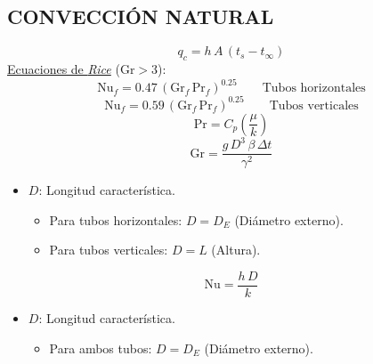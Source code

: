 \documentclass[letter,oneside,10pt]{article}
\begin{document}
\begin{multicols}{3}
\section*{CONVECCIÓN NATURAL}
\begin{equation*}
    q_c = h\,A\,(t_s-t_\infty)
\end{equation*}
\underline{Ecuaciones de \emph{Rice}} ($\text{Gr} > 3$):
\begin{equation*}
    \text{Nu}_f = 0.47\,(\text{Gr}_f\,\text{Pr}_f)^{0.25}
    \qquad\text{Tubos horizontales}
\end{equation*}
\begin{equation*}
    \text{Nu}_f = 0.59\,(\text{Gr}_f\,\text{Pr}_f)^{0.25}
    \qquad\text{Tubos verticales}
\end{equation*}
\begin{equation*}
    \text{Pr} = C_p\left(\frac{\mu}{k}\right)
\end{equation*}
\begin{equation*}
    \text{Gr} = \frac{g\,D^3\,\beta\,\Delta t}{\gamma^2}
\end{equation*}
\tiny
\begin{itemize}
    \item $D$: Longitud característica.
        \begin{itemize}
            \item Para tubos horizontales: $D=D_E$ (Diámetro externo).
            \item Para tubos verticales: $D=L$ (Altura).
        \end{itemize}
\end{itemize}
\scriptsize
\begin{equation*}
    \text{Nu} = \frac{h\,D}{k}
\end{equation*}
\tiny
\begin{itemize}
    \item $D$: Longitud característica.
        \begin{itemize}
            \item Para ambos tubos: $D=D_E$ (Diámetro externo).
        \end{itemize}
\end{itemize}
\scriptsize

\end{multicols}
\end{document}
